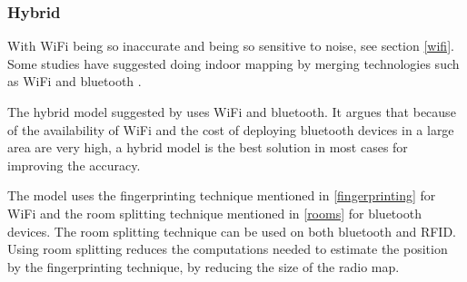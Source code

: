 \subsubsection{Hybrid}
With WiFi being so inaccurate and being so sensitive to noise, see section \ref{wifi}.
Some studies have suggested doing indoor mapping by merging technologies such as WiFi and bluetooth \cite{hybrid_wifi_bluetooth} \cite{fusion_wifi_bluetooth}.

The hybrid model suggested by \citet{hybrid_wifi_bluetooth} uses WiFi and bluetooth.
It argues that because of the availability of WiFi and the cost of deploying bluetooth devices in a large area are very high, a hybrid model is the best solution in most cases for improving the accuracy.

The model uses the fingerprinting technique mentioned in \cref{fingerprinting} for WiFi and the room splitting technique mentioned in \cref{rooms} for bluetooth devices.
The room splitting technique can be used on both bluetooth and RFID.
Using room splitting reduces the computations needed to estimate the position by the fingerprinting technique, by reducing the size of the radio map.